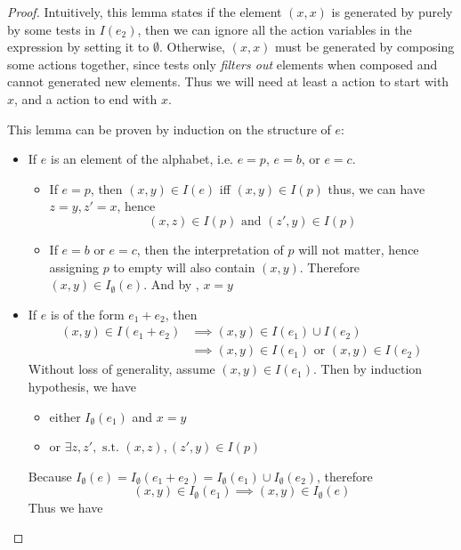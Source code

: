 \begin{proof}
    Intuitively, this lemma states
    if the element \((x, x)\) is generated by purely by some tests 
    in \(I(e_2)\),
    then we can ignore all the action variables in the expression by setting it to \(∅\).
    Otherwise, \((x, x)\) must be generated by composing some actions together,
    since tests only \emph{filters out} elements when composed 
    and cannot generated new elements.
    Thus we will need at least a action to start with \(x\), 
    and a action to end with \(x\).
    
    This lemma can be proven by induction on the structure of \(e\): 
    \begin{itemize}
        \item If \(e\) is an element of the alphabet, i.e. \(e = p\), \(e = b\), or \(e = c\).
        \begin{itemize}
        \item If \(e = p\), then \((x, y) ∈ I(e)\) 
            iff \((x, y) ∈ I(p)\)
            thus, we can have \(z = y, z' = x\), hence 
            \[(x, z) ∈ I(p)  \text{ and }  (z', y) ∈ I(p)\]
        \item If \(e = b\) or \(e = c\),
            then the interpretation of \(p\) will not matter, 
            hence assigning \(p\) to empty will also contain \((x, y)\).
            Therefore \((x, y) ∈ I_∅(e)\).
            And by , \(x = y\)
        \end{itemize}
        \item If \(e\) is of the form \(e_1 + e_2\),
        then 
        \begin{align*}
            (x, y) ∈ I(e_1 + e_2)
            & ⟹ (x, y) ∈ I(e_1) ∪ I(e_2) \\
            & ⟹ (x, y) ∈ I(e_1) \text{ or } (x, y) ∈ I(e_2)
        \end{align*}
        Without loss of generality, assume \((x, y) ∈ I(e_1)\).
        Then by induction hypothesis, we have 
        \begin{itemize}[nosep]
            \item either \(I_∅(e_1)\) and \(x = y\)
            \item or \(∃ z, z', \text{ s.t. } (x, z), (z', y) ∈ I(p)\)
        \end{itemize}
        Because \(I_∅(e) = 
        I_∅(e_1 + e_2) = 
        I_∅(e_1) ∪ I_∅(e_2)\),
        therefore 
        \[(x, y) ∈ I_∅(e_1) ⟹ (x, y) ∈ I_∅(e)\]
        Thus we have
        \begin{itemize}[nosep]

\end{itemize}
\end{itemize}
\end{proof}
